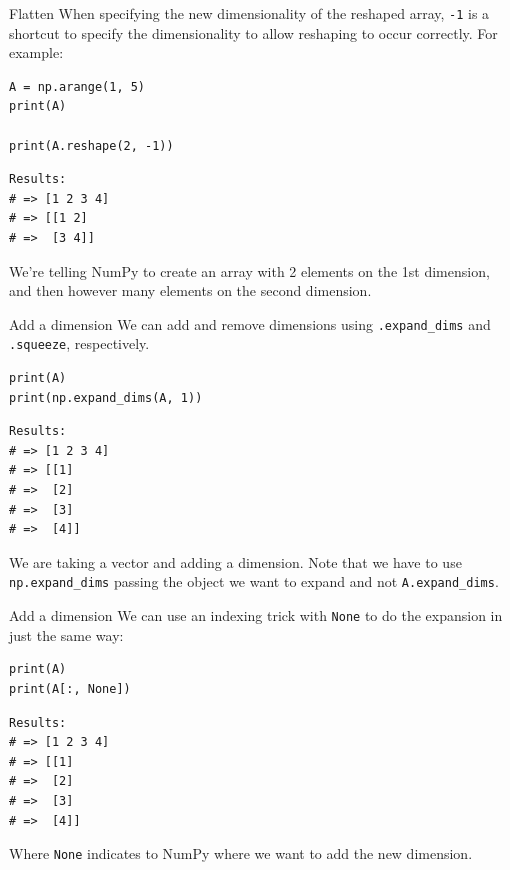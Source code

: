 \documentclass[10pt]{beamer}
\begin{document}
\begin{frame}[label={sec:org18f436a},fragile]{Flatten}
 When specifying the new dimensionality of the reshaped array, \texttt{-1} is a shortcut to
specify the dimensionality to allow reshaping to occur correctly. For example:

\begin{verbatim}
A = np.arange(1, 5)
print(A)

print(A.reshape(2, -1))
\end{verbatim}

\begin{verbatim}
Results: 
# => [1 2 3 4]
# => [[1 2]
# =>  [3 4]]
\end{verbatim}


We're telling NumPy to create an array with 2 elements on the 1st dimension, and then
however many elements on the second dimension.
\end{frame}

\begin{frame}[label={sec:org53d8d06},fragile]{Add a dimension}
 We can add and remove dimensions using \texttt{.expand\_dims} and \texttt{.squeeze}, respectively.

\begin{verbatim}
print(A)
print(np.expand_dims(A, 1))
\end{verbatim}

\begin{verbatim}
Results: 
# => [1 2 3 4]
# => [[1]
# =>  [2]
# =>  [3]
# =>  [4]]
\end{verbatim}


We are taking a vector and adding a dimension. Note that we have to use
\texttt{np.expand\_dims} passing the object we want to expand and not \texttt{A.expand\_dims}.
\end{frame}

\begin{frame}[label={sec:org109dc85},fragile]{Add a dimension}
 We can use an indexing trick with \texttt{None} to do the expansion in just the same way:

\begin{verbatim}
print(A)
print(A[:, None])
\end{verbatim}

\begin{verbatim}
Results: 
# => [1 2 3 4]
# => [[1]
# =>  [2]
# =>  [3]
# =>  [4]]
\end{verbatim}


Where \texttt{None} indicates to NumPy where we want to add the new dimension.
\end{frame}
\end{document}
